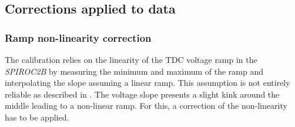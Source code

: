 \subsection{Corrections applied to data}

\subsubsection{Ramp non-linearity correction}
\label{subsec:lin_corr}

The calibration relies on the linearity of the TDC voltage ramp in the \textit{SPIROC2B} by measuring the minimum and maximum of the ramp and interpolating the slope assuming a linear ramp. This assumption is not entirely reliable as described in \cite{Hartbrich2011, Brianne2012}. The voltage slope presents a slight kink around the middle leading to a non-linear ramp. For this, a correction of the non-linearity has to be applied.

